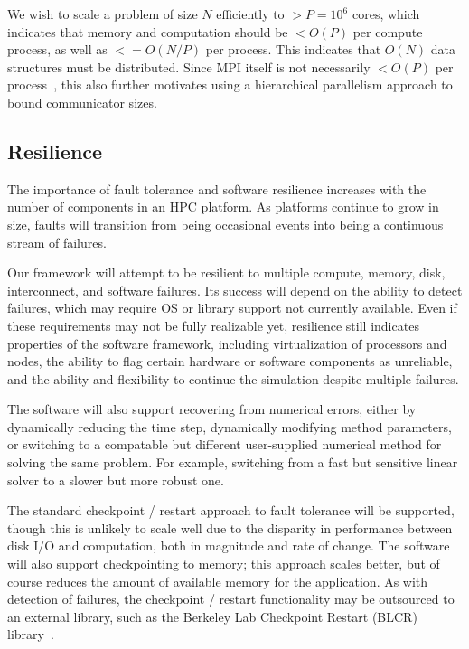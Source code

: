 \documentclass[10pt]{article}
\begin{document}
We wish to scale a problem of size $N$ efficiently to $> P = 10^6$
cores, which indicates that memory and computation should be $< O(P)$
per compute process, as well as $<= O(N/P)$ per process.  This
indicates that $O(N)$ data structures must be distributed.  Since MPI
itself is not necessarily $< O(P)$ per process~\cite{BaBu09}, this also
further motivates using a hierarchical parallelism approach to bound
communicator sizes.

\subsection{Resilience} \label{ss:require-resilience}

The importance of fault tolerance and software resilience increases
with the number of components in an HPC platform.  As platforms
continue to grow in size, faults will transition from being occasional
events into being a continuous stream of failures.

Our framework will attempt to be resilient to multiple compute,
memory, disk, interconnect, and software failures.  Its success will
depend on the ability to detect failures, which may require OS or
library support not currently available.  Even if these requirements
may not be fully realizable yet, resilience still indicates properties
of the software framework, including virtualization of processors and
nodes, the ability to flag certain hardware or software components as
unreliable, and the ability and flexibility to continue the simulation
despite multiple failures.

The software will also support recovering from numerical errors,
either by dynamically reducing the time step, dynamically modifying
method parameters, or switching to a compatable but different
user-supplied numerical method for solving the same problem.  For
example, switching from a fast but sensitive linear solver to a slower
but more robust one.

The standard checkpoint / restart approach to fault tolerance will be
supported, though this is unlikely to scale well due to the disparity
in performance between disk I/O and computation, both in magnitude and
rate of change.  The software will also support checkpointing to
memory; this approach scales better, but of course reduces the amount
of available memory for the application.  As with detection of
failures, the checkpoint / restart functionality may be outsourced to
an external library, such as the Berkeley Lab Checkpoint Restart
(BLCR) library~\cite{wwwblcr}.
\end{document}
